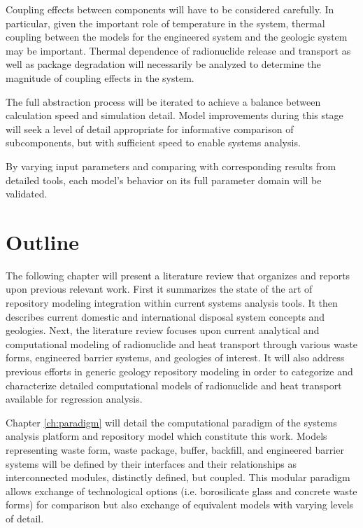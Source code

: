 Coupling effects between components will have to be considered carefully.  In 
particular, given the important role of temperature in the system, thermal 
coupling between the models for the engineered system and the geologic system 
may be important. Thermal dependence of radionuclide release and transport as 
well as package degradation will necessarily be analyzed to determine the 
magnitude of coupling effects in the system.


The full abstraction process will be iterated to achieve a balance between 
calculation speed and simulation detail. Model improvements during this stage 
will seek a
level of detail appropriate for informative comparison of subcomponents, but 
with sufficient speed to enable systems analysis. 


By varying input parameters and comparing with corresponding results from 
detailed tools, each model's behavior on its full parameter domain will be 
validated.


\section{Outline}


The following chapter will present a literature review that organizes and 
reports upon previous relevant work. First it summarizes the state of the art of 
repository modeling integration within current systems analysis tools. It then 
describes current domestic and international disposal system concepts and
geologies.  Next, the literature review focuses upon current analytical and 
computational modeling of radionuclide and heat transport through various waste 
forms, engineered barrier systems, and geologies of interest.  It will also 
address previous efforts in generic geology repository modeling in order to 
categorize and characterize detailed computational models of radionuclide and 
heat transport available for regression analysis.


Chapter \ref{ch:paradigm} will detail the computational paradigm of the \Cyclus 
systems analysis platform and repository model which constitute this work. Models
representing waste form, waste package, buffer, backfill, and engineered barrier 
systems will be defined by their interfaces and their relationships as 
interconnected modules, distinctly defined, but coupled. This modular paradigm 
allows exchange  of technological options (i.e. borosilicate glass and concrete 
waste forms) for comparison but also exchange of equivalent models with varying 
levels of detail.

